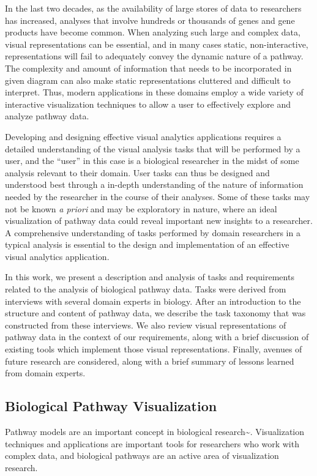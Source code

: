 In the last two decades, as the availability of large stores of data to
researchers has increased, analyses that involve hundreds or thousands
of genes and gene products have become common. When analyzing such large
and complex data, visual representations can be essential, and in many
cases static, non-interactive, representations will fail to adequately
convey the dynamic nature of a pathway. The complexity and amount of
information that needs to be incorporated in given diagram can also make
static representations cluttered and difficult to interpret. Thus,
modern applications in these domains employ a wide variety of
interactive visualization techniques to allow a user to effectively
explore and analyze pathway data.

Developing and designing effective visual analytics applications
requires a detailed understanding of the visual analysis tasks that will
be performed by a user, and the ``user'' in this case is a biological
researcher in the midst of some analysis relevant to their domain. User
tasks can thus be designed and understood best through a in-depth
understanding of the nature of information needed by the researcher in
the course of their analyses. Some of these tasks may not be known
\emph{a priori} and may be exploratory in nature, where an ideal
visualization of pathway data could reveal important new insights to a
researcher. A comprehensive understanding of tasks performed by domain
researchers in a typical analysis is essential to the design and
implementation of an effective visual analytics application.

In this work, we present a description and analysis of tasks and
requirements related to the analysis of biological pathway data. Tasks
were derived from interviews with several domain experts in biology.
After an introduction to the structure and content of pathway data, we
describe the task taxonomy that was constructed from these interviews.
We also review visual representations of pathway data in the context of
our requirements, along with a brief discussion of existing tools which
implement those visual representations. Finally, avenues of future
research are considered, along with a brief summary of lessons learned
from domain experts.

\subsection*{Biological Pathway Visualization}

Pathway models are an important concept in biological
research\textasciitilde{}\cite{cairns2011regulation, luo2003targeting, reya2001stem}.
Visualization techniques and applications are important tools for
researchers who work with complex data, and biological pathways are an
active area of visualization research.

